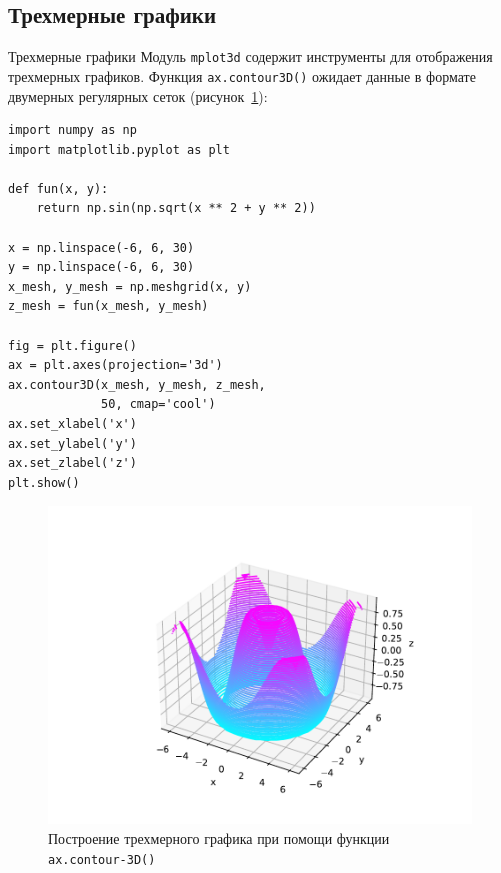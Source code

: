 \documentclass[aspectratio=169, mathserif]{beamer}	%
\begin{document}
\subsection{Трехмерные графики}
\begin{frame}[fragile, label=m]{Трехмерные графики}
\scriptsize
Модуль \texttt{mplot3d} содержит инструменты для отображения трехмерных графиков. Функция \texttt{ax.contour3D()} ожидает данные в формате двумерных регулярных сеток (рисунок~\ref{fig:fig_24}):
\vfill
\begin{minipage}{.4\textwidth}
\begin{verbatim}
import numpy as np
import matplotlib.pyplot as plt

def fun(x, y):
    return np.sin(np.sqrt(x ** 2 + y ** 2))

x = np.linspace(-6, 6, 30)
y = np.linspace(-6, 6, 30)
x_mesh, y_mesh = np.meshgrid(x, y)
z_mesh = fun(x_mesh, y_mesh)

fig = plt.figure()
ax = plt.axes(projection='3d')
ax.contour3D(x_mesh, y_mesh, z_mesh,
             50, cmap='cool')
ax.set_xlabel('x')
ax.set_ylabel('y')
ax.set_zlabel('z')
plt.show()
\end{verbatim}
\end{minipage}
\begin{minipage}{.09\textwidth}
\hfill
\end{minipage}
\begin{minipage}{.5\textwidth}
\begin{figure}[h!]
	\centering
	\includegraphics[width=.87\linewidth]{./pics/Figure_24}
	\caption{Построение трехмерного графика при помощи функции \texttt{ax.contour-3D()}}
	\label{fig:fig_24}
\end{figure}
\end{minipage}
\vfill
\end{frame}
\end{document}
